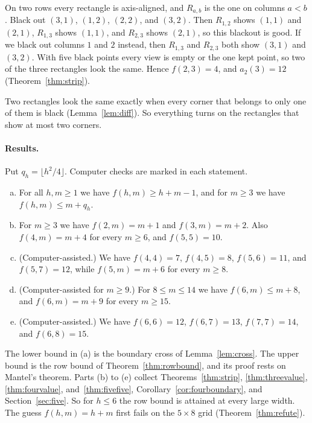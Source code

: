 \begin{example}\label{ex:strip23}
On two rows every rectangle is axis-aligned, and $R_{a,b}$ is the one on columns $a<b$.
Black out $(3,1)$, $(1,2)$, $(2,2)$, and $(3,2)$. Then $R_{1,2}$ shows $(1,1)$ and
$(2,1)$, $R_{1,3}$ shows $(1,1)$, and $R_{2,3}$ shows $(2,1)$, so this blackout is good.
If we black out columns $1$ and $2$ instead, then $R_{1,3}$ and $R_{2,3}$ both show
$(3,1)$ and $(3,2)$. With five black points every view is empty or the one kept point, so
two of the three rectangles look the same. Hence $f(2,3)=4$, and $a_2(3)=12$
(Theorem~\ref{thm:strip}).
\end{example}

Two rectangles look the same exactly when every corner that belongs to only one of them
is black (Lemma~\ref{lem:diff}). So everything turns on the rectangles that show at most
two corners.

\paragraph{Results.} Put $q_h=\lfloor h^2/4\rfloor$. Computer checks are marked in each
statement.

\begin{thmA}
\begin{enumerate}[(a)]
\item For all $h,m\ge1$ we have $f(h,m)\ge h+m-1$, and for $m\ge3$ we have
$f(h,m)\le m+q_h$.
\item For $m\ge3$ we have $f(2,m)=m+1$ and $f(3,m)=m+2$. Also $f(4,m)=m+4$ for every
$m\ge6$, and $f(5,5)=10$.
\item (Computer-assisted.) We have $f(4,4)=7$, $f(4,5)=8$, $f(5,6)=11$, and $f(5,7)=12$, while
$f(5,m)=m+6$ for every $m\ge8$.
\item (Computer-assisted for $m\ge9$.) For $8\le m\le14$ we have $f(6,m)\le m+8$, and
$f(6,m)=m+9$ for every $m\ge15$.

\item (Computer-assisted.) We have $f(6,6)=12$, $f(6,7)=13$, $f(7,7)=14$, and $f(6,8)=15$.
\end{enumerate}
\end{thmA}

The lower bound in (a) is the boundary cross of Lemma~\ref{lem:cross}. The upper bound is
the row bound of Theorem~\ref{thm:rowbound}, and its proof rests on Mantel's theorem.
Parts (b) to (e) collect Theorems~\ref{thm:strip}, \ref{thm:threevalue},
\ref{thm:fourvalue}, and~\ref{thm:fivefive}, Corollary~\ref{cor:fourboundary}, and
Section~\ref{sec:five}. So for $h\le6$ the row bound is attained at every large width.
The guess $f(h,m)=h+m$ first fails on the $5\times8$ grid (Theorem~\ref{thm:refute}).

